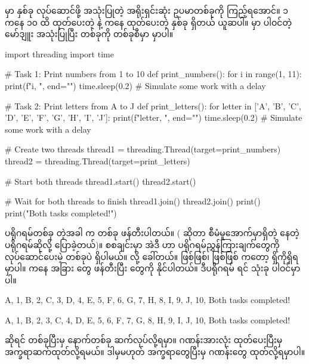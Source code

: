  မှာ  နှစ်ခု  လုပ်ဆောင်ဖို့  အသုံးပြုတဲ့ အရိုးရှင်းဆုံး ဥပမာတစ်ခုကို ကြည့်ရအောင်။ ၁ ကနေ ၁၀ ထိ ထုတ်ပေးတဲ့  နဲ့  ကနေ  ထုတ်ပေးတဲ့  နှစ်ခု ရှိတယ် ယူဆပါ။  မှာ ပါဝင်တဲ့  မော်ဒျူး အသုံးပြုပြီး   တစ်ခုကို  တစ်ခုစီမှာ  မှာပါ။

%
\begin{py}
import threading
import time

# Task 1: Print numbers from 1 to 10
def print_numbers():
    for i in range(1, 11):
        print(f"{i}, ", end="")
        time.sleep(0.2)  # Simulate some work with a delay

# Task 2: Print letters from A to J
def print_letters():
    for letter in ['A', 'B', 'C', 'D', 'E', 'F', 'G', 'H', 'I', 'J']:
        print(f"{letter}, ", end="")
        time.sleep(0.2)  # Simulate some work with a delay

# Create two threads
thread1 = threading.Thread(target=print_numbers)
thread2 = threading.Thread(target=print_letters)

# Start both threads
thread1.start()
thread2.start()

# Wait for both threads to finish
thread1.join()
thread2.join()
print()
print("Both tasks completed!")
\end{py}
%

ပရိုဂရမ်တစ်ခု  တဲ့အခါ  က  တစ်ခု ဖန်တီးပါတယ်။ ( ဆိုတာ  စီမံမှုအောက်မှာရှိတဲ့  နေတဲ့ ပရိုဂရမ်ဆိုလို့ ပြောခဲ့တယ်)။ စစချင်းမှာ အဲဒီ  ဟာ ပရိုဂရမ်ညွှန်ကြားချက်တွေကို လုပ်ဆောင်ပေးမဲ့  တစ်ခုပဲ ရှိပါမယ်။   လို့ ခေါ်တယ်။  ဖြစ်ဖြစ်၊  ဖြစ်ဖြစ်  ကတော့ ရှိကိုရှိရမှာပါ။  ကနေ အခြား  တွေ ဖန်တီးပြီး  တွေကို   နိုင်ပါတယ်။ ဒီပရိုဂရမ်  ရင်  သုံးခု ပါဝင်မှာပါ။ 

\begin{vbtm}
A, 1, B, 2, C, 3, D, 4, E, 5, F, 6, G, 7, H, 8, I, 9, J, 10, 
Both tasks completed!
\end{vbtm}

%
\begin{vbtm}
A, 1, B, 2, 3, C, 4, D, E, 5, 6, F, 7, G, 8, H, 9, I, J, 10, 
Both tasks completed!
\end{vbtm}
%

 ဆိုရင် တစ်ခုပြီးမှ နောက်တစ်ခု ဆက်လုပ်လို့ရမှာ။ ဂဏန်းအားလုံး ထုတ်ပေးပြီးမှ အက္ခရာဆက်ထုတ်လို့ရမယ်။ ဒါမှမဟုတ် အက္ခရာတွေပြီးမှ ဂဏန်းတွေ ထုတ်လို့ရမှာပါ။  \fEn{}



